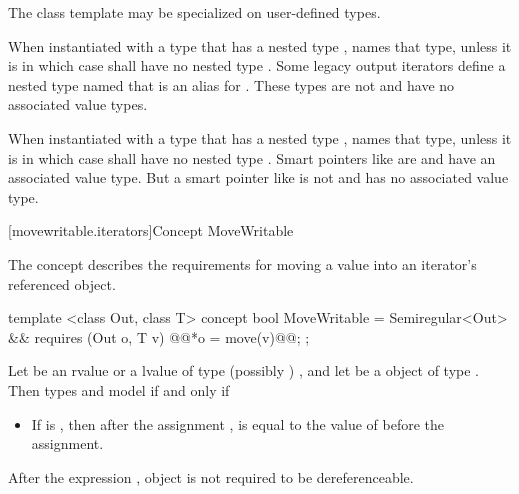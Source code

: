 \begin{addedblock}
\pnum
The  class template may be specialized on user-defined types.

\pnum
When instantiated with a type  that has a nested type ,
 names that type, unless it is  in which case
 shall have no nested type . \enternote Some legacy output
iterators define a nested type named  that is an alias for . These
types are not  and have no associated value types.\exitnote

\pnum
When instantiated with a type  that has a nested type ,
 names that type, unless it is  in which case
 shall have no nested type . \enternote Smart pointers like
 are  and have an associated value type. But a smart pointer
like  is not  and has no associated value type.\exitnote

{\color{newclr}
[movewritable.iterators]{Concept MoveWritable}
}

\pnum
The  concept describes the requirements for moving a value into an iterator's
referenced object.

%
\begin{codeblock}
  template <class Out, class T>
  concept bool MoveWritable =
    Semiregular<Out> &&
    requires (Out o, T v) {
      @\oldtxt{\{ }@*o = move(v)@\oldtxt{ \}}@;
    };
\end{codeblock}

\pnum
Let  be an rvalue or a lvalue of type (possibly ) , and let 
be a object of type . Then types  and
 model  if and only if

\begin{itemize}
\item If  is ,
then after the assignment ,  is equal
to the value of  before the assignment.
\end{itemize}

\pnum
After the expression , object  is not required to be dereferenceable.


\end{addedblock}
